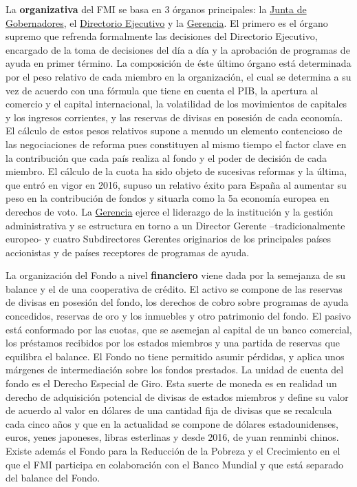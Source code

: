 \documentclass{nuevotema}
\begin{document}
La  \textbf{organizativa} del FMI se basa en 3 órganos principales: la \underline{Junta de Gobernadores}, el \underline{Directorio Ejecutivo} y la \underline{Gerencia}. El primero es el órgano supremo que refrenda formalmente las decisiones del Directorio Ejecutivo, encargado de la toma de decisiones del día a día y la aprobación de programas de ayuda en primer término. La composición de éste último órgano está determinada por el peso relativo de cada miembro en la organización, el cual se determina a su vez de acuerdo con una fórmula que tiene en cuenta el PIB, la apertura al comercio y el capital internacional, la volatilidad de los movimientos de capitales y los ingresos corrientes, y las reservas de divisas en posesión de cada economía. El cálculo de estos pesos relativos supone a menudo un elemento contencioso de las negociaciones de reforma pues constituyen al mismo tiempo el factor clave en la contribución que cada país realiza al fondo y el poder de decisión de cada miembro. El cálculo de la cuota ha sido objeto de sucesivas reformas y la última, que entró en vigor en 2016, supuso un relativo éxito para España al aumentar su peso en la contribución de fondos y situarla como la 5a economía europea en derechos de voto. La \underline{Gerencia} ejerce el liderazgo de la institución y la gestión administrativa y se estructura en torno a un Director Gerente --tradicionalmente europeo- y cuatro Subdirectores Gerentes originarios de los principales países accionistas y de países receptores de programas de ayuda.

La organización del Fondo a nivel \textbf{financiero} viene dada por la semejanza de su balance y el de una cooperativa de crédito. El activo se compone de las reservas de divisas en posesión del fondo, los derechos de cobro sobre programas de ayuda concedidos, reservas de oro y los inmuebles y otro patrimonio del fondo. El pasivo está conformado por las cuotas, que se asemejan al capital de un banco comercial, los préstamos recibidos por los estados miembros y una partida de reservas que equilibra el balance. El Fondo no tiene permitido asumir pérdidas, y aplica unos márgenes de intermediación sobre los fondos prestados. La unidad de cuenta del fondo es el Derecho Especial de Giro. Esta suerte de moneda es en realidad un derecho de adquisición potencial de divisas de estados miembros y define su valor de acuerdo al valor en dólares de una cantidad fija de divisas que se recalcula cada cinco años y que en la actualidad se compone de dólares estadounidenses, euros, yenes japoneses, libras esterlinas y desde 2016, de yuan renminbi chinos. Existe además el Fondo para la Reducción de la Pobreza y el Crecimiento en el que el FMI participa en colaboración con el Banco Mundial y que está separado del balance del Fondo.
\end{document}
